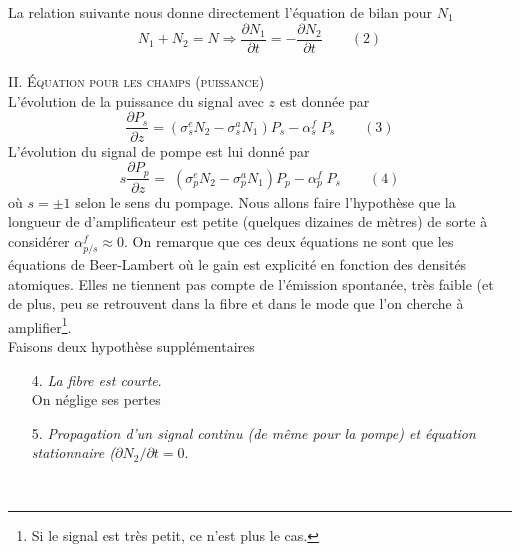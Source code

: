 La relation suivante nous donne directement l'équation de bilan pour $N_1$
\begin{equation}
{N_1} + {N_2} = N \Rightarrow \frac{{\partial {N_1}}}{{\partial t}} =  - \frac{{\partial {N_2}}}
{{\partial t}}\qquad(2)
\end{equation}\ \\

\textsc{II. Équation pour les champs (puissance)}\\
L'évolution de la puissance du signal avec $z$ est donnée par
\begin{equation}
\frac{{\partial {P_s}}}{{\partial z}} = (\sigma _s^e{N_2} - \sigma _s^a{N_1}){P_s} - \alpha _s^f\;{P_s}\qquad(3)
\end{equation}
L'évolution du signal de pompe est lui donné par
\begin{equation}
s\frac{{\partial {P_p}}}{{\partial z}} = \;(\sigma _p^e{N_2} - \sigma _p^a{N_1}){P_p} - \alpha _p^f\;{P_s}\qquad(4)
\end{equation}
où $s=\pm1$ selon le sens du pompage. Nous allons faire l'hypothèse que la longueur de d'amplificateur
est petite (quelques dizaines de mètres) de sorte à considérer $\alpha_{p/s}^f\approx0$. On remarque
que ces deux équations ne sont que les équations de Beer-Lambert où le gain est explicité en fonction
des densités atomiques. Elles ne tiennent pas compte de l'émission spontanée, très faible (et de plus,
peu se retrouvent dans la fibre et dans le mode que l'on cherche à amplifier\footnote{Si le signal
est très petit, ce n'est plus le cas.}.\\

Faisons deux hypothèse supplémentaires
\begin{itemize}
\item[4.] \textit{La fibre est courte}.\\
On néglige ses pertes
\item[5.] \textit{Propagation d'un signal continu (de même pour la pompe) et équation stationnaire
($\partial N_2/\partial t=0$}.
\end{itemize}\ 

